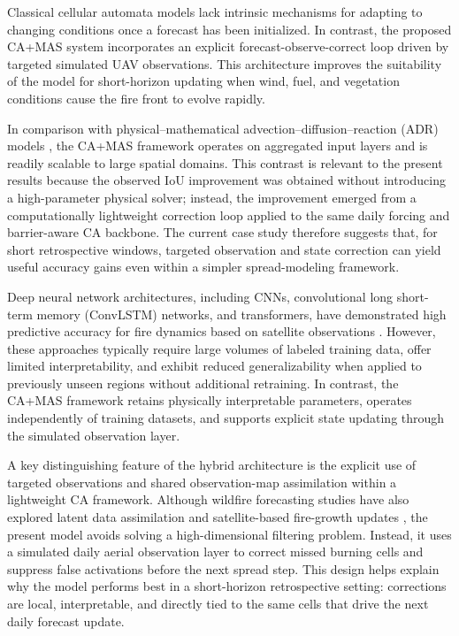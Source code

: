 \documentclass[10pt,letterpaper]{article}
\begin{document}
Classical cellular automata models \cite{freire2019,schumaker2022} lack intrinsic mechanisms for adapting to changing
conditions once a forecast has been initialized. In contrast, the
proposed CA+MAS system incorporates an explicit forecast-observe-correct
loop driven by targeted simulated UAV observations. This architecture
improves the suitability of the model for short-horizon updating when
wind, fuel, and vegetation conditions cause the fire front to evolve
rapidly.

In comparison with physical--mathematical advection--diffusion--reaction
(ADR) models \cite{navasmontilla2025}, the CA+MAS framework
operates on aggregated input layers and is readily scalable to large
spatial domains. This contrast is relevant to the present results
because the observed IoU improvement was obtained without introducing a
high-parameter physical solver; instead, the improvement emerged from a
computationally lightweight correction loop applied to the same daily
forcing and barrier-aware CA backbone. The current case study therefore
suggests that, for short retrospective windows, targeted observation and
state correction can yield useful accuracy gains even within a simpler
spread-modeling framework.

Deep neural network architectures, including CNNs, convolutional long
short-term memory (ConvLSTM) networks, and transformers, have demonstrated high predictive accuracy for fire
dynamics based on satellite observations \cite{andrianarivony2024,marjani2023}. However, these
approaches typically require large volumes of labeled training data,
offer limited interpretability, and exhibit reduced generalizability
when applied to previously unseen regions without additional retraining.
In contrast, the CA+MAS framework retains physically interpretable
parameters, operates independently of training datasets, and supports
explicit state updating through the simulated observation layer.

A key distinguishing feature of the hybrid architecture is the explicit
use of targeted observations and shared observation-map assimilation
within a lightweight CA framework. Although wildfire
forecasting studies have also explored latent data assimilation and
satellite-based fire-growth updates \cite{cheng2022,chen2022,mcclure2023},
the present model avoids solving a high-dimensional filtering problem.
Instead, it uses a simulated daily aerial observation layer to correct
missed burning cells and suppress false activations before the next
spread step. This design helps explain why the model performs best in a
short-horizon retrospective setting: corrections are local,
interpretable, and directly tied to the same cells that drive the next
daily forecast update.
\end{document}

